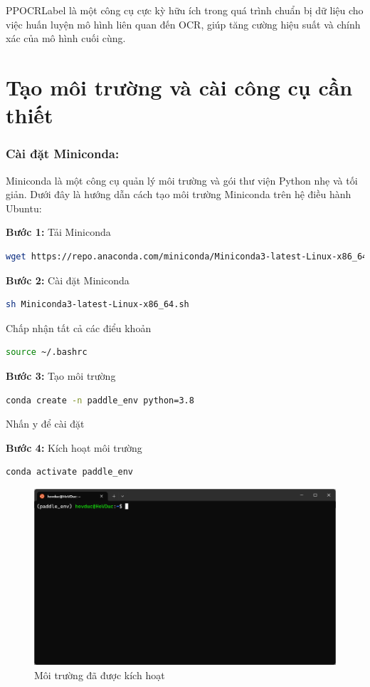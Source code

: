 PPOCRLabel là một công cụ cực kỳ hữu ích trong quá trình chuẩn bị dữ liệu cho việc huấn luyện mô hình liên quan đến OCR, giúp tăng cường hiệu suất và chính xác của mô hình cuối cùng.

\section{Tạo môi trường và cài công cụ cần thiết}
\subsubsection*{Cài đặt Miniconda:}
Miniconda là một công cụ quản lý môi trường và gói thư viện Python nhẹ và tối giản. Dưới đây là hướng dẫn cách tạo môi trường Miniconda trên hệ điều hành Ubuntu:

\textbf{Bước 1:} Tải Miniconda
\begin{lstlisting}[language=bash]
    wget https://repo.anaconda.com/miniconda/Miniconda3-latest-Linux-x86_64.sh
\end{lstlisting}

\textbf{Bước 2:} Cài đặt Miniconda
\begin{lstlisting}[language=bash]
    sh Miniconda3-latest-Linux-x86_64.sh    
\end{lstlisting}
Chấp nhận tất cả các điểu khoản
\begin{lstlisting}[language=bash]
    source ~/.bashrc
\end{lstlisting}

\textbf{Bước 3:} Tạo môi trường
\begin{lstlisting}[language=bash]
    conda create -n paddle_env python=3.8
\end{lstlisting}
Nhấn y để cài đặt

\textbf{Bước 4:} Kích hoạt môi trường
\begin{lstlisting}[language=bash]
    conda activate paddle_env
\end{lstlisting}
\begin{figure}[h]
    \includegraphics[scale=0.5]{images/terminal-conda-activate.png}    
    \centering
    \caption{Môi trường đã được kích hoạt}
\end{figure}

